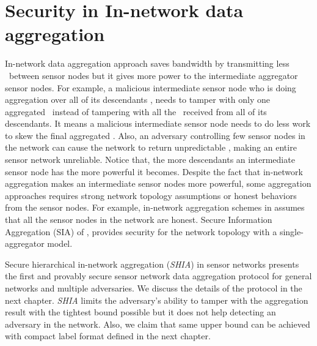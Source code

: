 \section{Security in In-network data aggregation}
	In-network data aggregation approach saves bandwidth by transmitting less \payloads\  between sensor nodes but it gives more power to the intermediate aggregator sensor nodes. 
	For example, a malicious intermediate sensor node who is doing aggregation over all of its descendants \payloads, needs to tamper with only one aggregated \payload\ instead of tampering with all the \payloads\ received from all of its descendants. 
	It means a malicious intermediate sensor node needs to do less work to skew the final aggregated \payload.
	Also, an adversary controlling few sensor nodes in the network can cause the network to return unpredictable \payloads, making an entire sensor network unreliable.
	Notice that, the more descendants an intermediate sensor node has the more powerful it becomes.
	Despite the fact that in-network aggregation makes an intermediate sensor nodes more powerful, some aggregation approaches requires strong network topology assumptions or honest behaviors from the sensor nodes.
	For example, in-network aggregation schemes in \cite{yao2002cougar, madden2003design} assumes that all the sensor nodes in the network are honest. Secure Information Aggregation (SIA) of \cite{przydatek2003sia}, provides security for the network topology with a single-aggregator model.  

	Secure hierarchical in-network aggregation (\textit{SHIA}) in sensor networks \cite{chan2006secure} presents the first and provably secure sensor network data aggregation protocol for general networks and multiple adversaries. 
	We discuss the details of the protocol in the next chapter. 
	\textit{SHIA} limits the adversary's ability to tamper with the aggregation result with the tightest bound possible but it does not help detecting an adversary in the network.
	Also, we claim that same upper bound can be achieved with compact label format defined in the next chapter.